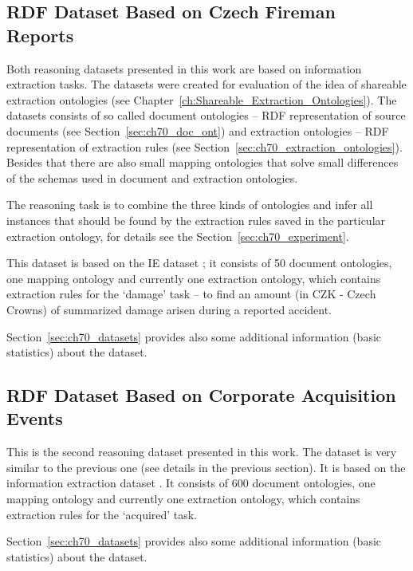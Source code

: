 \subsection{RDF Dataset Based on Czech Fireman Reports} \label{sec:ch40_rdf_fireman}

Both reasoning datasets presented in this work are based on information extraction tasks. The datasets were created for evaluation of the idea of shareable extraction ontologies (see Chapter~\ref{ch:Shareable_Extraction_Ontologies}). The datasets consists of so called document ontologies -- RDF representation of source documents (see Section~\ref{sec:ch70_doc_ont}) and extraction ontologies -- RDF representation of extraction rules (see Section~\ref{sec:ch70_extraction_ontologies}). Besides that there are also small mapping ontologies that solve small differences of the schemas used in document and extraction ontologies.

The reasoning task is to combine the three kinds of ontologies and infer all instances that should be found by the extraction rules saved in the particular extraction ontology, for details see the Section~\ref{sec:ch70_experiment}.

This dataset is based on the IE dataset ; it consists of 50 document ontologies, one mapping ontology and currently one extraction ontology, which contains extraction rules for the `damage' task -- to find an amount (in CZK - Czech Crowns) of summarized damage arisen during a reported accident.

Section~\ref{sec:ch70_datasets} provides also some additional information (basic statistics) about the dataset.


\subsection{RDF Dataset Based on Corporate Acquisition Events} \label{sec:ch40_rdf_acquisitions}

This is the second reasoning dataset presented in this work. The dataset is very similar to the previous one (see details in the previous section). It is based on the information extraction dataset . It consists of 600 document ontologies, one mapping ontology and currently one extraction ontology, which contains extraction rules for the `acquired' task.

Section~\ref{sec:ch70_datasets} provides also some additional information (basic statistics) about the dataset.


